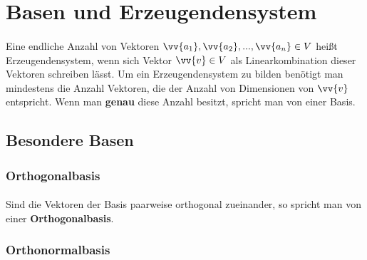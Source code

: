 \section{Basen und Erzeugendensystem}

    \paragraph{} Eine endliche Anzahl von Vektoren $\vv{a_1},\vv{a_2},...,\vv{a_n}\in V$ heißt Erzeugendensystem, wenn sich  Vektor $\vv{v}\in V$
     als Linearkombination dieser Vektoren schreiben lässt. Um ein Erzeugendensystem zu bilden benötigt man mindestens die Anzahl Vektoren, die der Anzahl
      von Dimensionen von $\vv{v}$ entspricht. Wenn man \textbf{genau} diese Anzahl besitzt, spricht man von einer Basis.

    \subsection{Besondere Basen}

        \subsubsection{Orthogonalbasis}

            \paragraph{} Sind die Vektoren der Basis paarweise orthogonal zueinander, so spricht man von einer \textbf{Orthogonalbasis}.

        \subsubsection{Orthonormalbasis}


